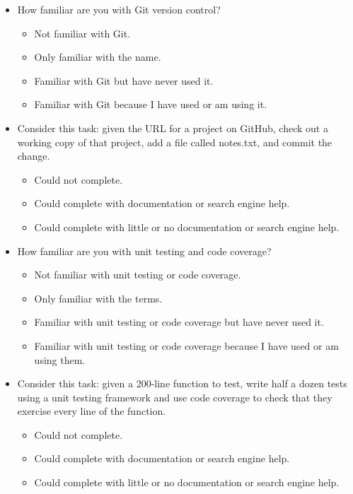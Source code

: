 \documentclass[10pt,a4paper,twocolumn]{article}
\begin{document}
\begin{itemize}
  \item
    How familiar are you with Git version control?
    \begin{itemize}[noitemsep]
    \item Not familiar with Git.
    \item Only familiar with the name.
    \item Familiar with Git but have never used it.
    \item Familiar with Git because I have used or am using it.
    \end{itemize}

  \item
    Consider this task: given the URL for a project on GitHub, check
    out a working copy of that project, add a file called notes.txt,
    and commit the change.
    \begin{itemize}[noitemsep]
    \item Could not complete.
    \item Could complete with documentation or search engine help.
    \item Could complete with little or no documentation or search engine help.
    \end{itemize}

  \item
    How familiar are you with unit testing and code coverage?
    \begin{itemize}[noitemsep]
    \item Not familiar with unit testing or code coverage.
    \item Only familiar with the terms.
    \item Familiar with unit testing or code coverage but have never used it.
    \item Familiar with unit testing or code coverage because I have used or am using them.
    \end{itemize}

  \item
    Consider this task: given a 200-line function to test, write half
    a dozen tests using a unit testing framework and use code coverage
    to check that they exercise every line of the function.
    \begin{itemize}[noitemsep]
    \item Could not complete.
    \item Could complete with documentation or search engine help.
    \item Could complete with little or no documentation or search engine help.
    \end{itemize}


\end{itemize}
\end{document}

